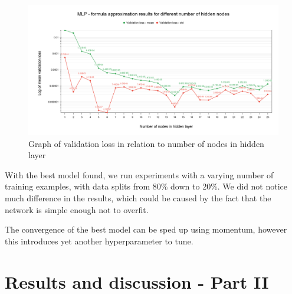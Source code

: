\documentclass[a4paper]{article}
\begin{document}
\begin{figure}[h!]
	\centering
	\includegraphics[width=12.5cm]{img/MLP - formula approximation results for different number of hidden nodes.png}
	\caption{Graph of validation loss in relation to number of nodes in hidden layer}
	\label{fig:mlp_nh}
\end{figure}

With the best model found, we run experiments with a varying number of training examples, with data splits from 80\% down to 20\%. We did not notice much difference in the results, which could be caused by the fact that the network is simple enough not to overfit.

The convergence of the best model can be sped up using momentum, however this introduces yet another hyperparameter to tune.


\section{Results and discussion - Part II} %
\end{document}
